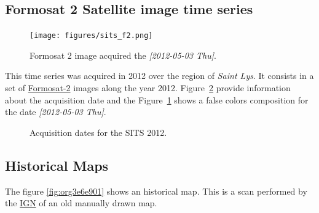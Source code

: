 \documentclass[a4paper,11pt,DIV=18]{scrartcl}
\begin{document}
\subsection{Formosat 2 Satellite image time series}
\label{sec:org1e45aef}
\begin{figure}[htbp]
\centering
\texttt{[image: figures/sits\_f2.png]}
\caption{\label{fig:org214023c}
Formosat 2 image acquired the \textit{[2012-05-03 Thu]}.}
\end{figure}

This time series was acquired in 2012 over the region of \emph{Saint Lys}. It
consists  in  a  set  of   \href{http://www.satimagingcorp.com/satellite-sensors/other-satellite-sensors/formosat-2/}{Formosat-2}  images  along  the  year  2012.
Figure~\ref{fig:SITS} provide information  about the acquisition
date and the Figure~\ref{fig:org214023c} shows a false colors composition for
the date \textit{[2012-05-03 Thu]}.

\begin{figure}[tb]
  \centering
  \caption{Acquisition dates for the SITS 2012.}
  \label{fig:SITS}
\end{figure}

\subsection{Historical Maps}
\label{sec:orgc626a5f}
The figure \ref{fig:org3e6e901} shows an historical map. This is a scan performed by
the \href{http://www.ign.fr/}{IGN} of an old manually drawn map.
\end{document}
